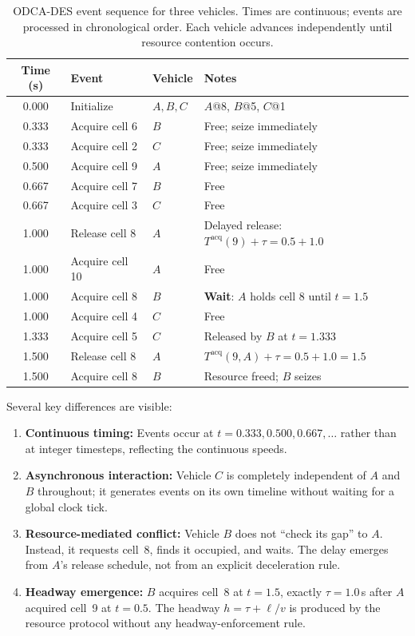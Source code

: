 \documentclass[review,number]{elsarticle}
\newcommand{\Tacq}{T^{\text{acq}}}
\begin{document}
\begin{table}[ht]
\centering
\caption{ODCA-DES event sequence for three vehicles. Times are continuous; events are processed in chronological order. Each vehicle advances independently until resource contention occurs.}
\label{tab:odca_example}
\begin{tabular}{@{}clll@{}}
\toprule
Time (s) & Event & Vehicle & Notes \\
\midrule
0.000 & Initialize & $A,B,C$ & $A$@8, $B$@5, $C$@1 \\
0.333 & Acquire cell 6 & $B$ & Free; seize immediately \\
0.333 & Acquire cell 2 & $C$ & Free; seize immediately \\
0.500 & Acquire cell 9 & $A$ & Free; seize immediately \\
0.667 & Acquire cell 7 & $B$ & Free \\
0.667 & Acquire cell 3 & $C$ & Free \\
1.000 & Release cell 8 & $A$ & Delayed release: $\Tacq(9) + \tau = 0.5 + 1.0$ \\
1.000 & Acquire cell 10 & $A$ & Free \\
1.000 & Acquire cell 8 & $B$ & \textbf{Wait}: $A$ holds cell 8 until $t=1.5$ \\
1.000 & Acquire cell 4 & $C$ & Free \\
1.333 & Acquire cell 5 & $C$ & Released by $B$ at $t = 1.333$ \\
1.500 & Release cell 8 & $A$ & $\Tacq(9,A) + \tau = 0.5 + 1.0 = 1.5$ \\
1.500 & Acquire cell 8 & $B$ & Resource freed; $B$ seizes \\
\bottomrule
\end{tabular}
\end{table}

Several key differences are visible:
\begin{enumerate}
    \item \textbf{Continuous timing:} Events occur at $t = 0.333, 0.500, 0.667, \ldots$ rather than at integer timesteps, reflecting the continuous speeds.
    \item \textbf{Asynchronous interaction:} Vehicle $C$ is completely independent of $A$ and $B$ throughout; it generates events on its own timeline without waiting for a global clock tick.
    \item \textbf{Resource-mediated conflict:} Vehicle $B$ does not ``check its gap'' to $A$. Instead, it requests cell~8, finds it occupied, and waits. The delay emerges from $A$'s release schedule, not from an explicit deceleration rule.
    \item \textbf{Headway emergence:} $B$ acquires cell~8 at $t = 1.5$, exactly $\tau = 1.0$\,s after $A$ acquired cell~9 at $t = 0.5$. The headway $h = \tau + \ell/v$ is produced by the resource protocol without any headway-enforcement rule.
\end{enumerate}
\end{document}
